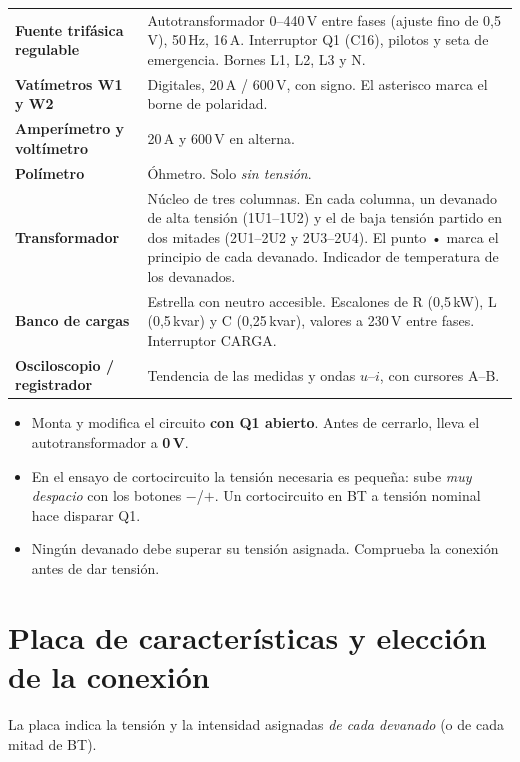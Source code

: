 \documentclass[11pt,a4paper]{article}
\begin{document}
\begin{tabularx}{\textwidth}{@{}>{\bfseries}l X@{}}
  \toprule
  Fuente trifásica regulable & Autotransformador 0–440\,V entre fases (ajuste fino de 0,5\,V), 50\,Hz, 16\,A. Interruptor Q1 (C16), pilotos y seta de emergencia. Bornes L1, L2, L3 y N. \\
  Vatímetros W1 y W2 & Digitales, 20\,A / 600\,V, con signo. El asterisco marca el borne de polaridad. \\
  Amperímetro y voltímetro & 20\,A y 600\,V en alterna. \\
  Polímetro & Óhmetro. Solo \emph{sin tensión}. \\
  Transformador & Núcleo de tres columnas. En cada columna, un devanado de alta tensión (1U1–1U2) y el de baja tensión partido en dos mitades (2U1–2U2 y 2U3–2U4). El punto • marca el principio de cada devanado. Indicador de temperatura de los devanados. \\
  Banco de cargas & Estrella con neutro accesible. Escalones de R (0,5\,kW), L (0,5\,kvar) y C (0,25\,kvar), valores a 230\,V entre fases. Interruptor CARGA. \\
  Osciloscopio / registrador & Tendencia de las medidas y ondas $u$–$i$, con cursores A–B. \\
  \bottomrule
\end{tabularx}

\begin{seguridad}
  \begin{itemize}[leftmargin=12pt]
    \item Monta y modifica el circuito \textbf{con Q1 abierto}. Antes de cerrarlo, lleva el autotransformador a \textbf{0\,V}.
    \item En el ensayo de cortocircuito la tensión necesaria es pequeña: sube \emph{muy despacio} con los botones $-$/$+$. Un cortocircuito en BT a tensión nominal hace disparar Q1.
    \item Ningún devanado debe superar su tensión asignada. Comprueba la conexión antes de dar tensión.
  \end{itemize}
\end{seguridad}

\section{Placa de características y elección de la conexión}
La placa indica la tensión y la intensidad asignadas \emph{de cada devanado} (o de cada mitad de BT).
\end{document}
